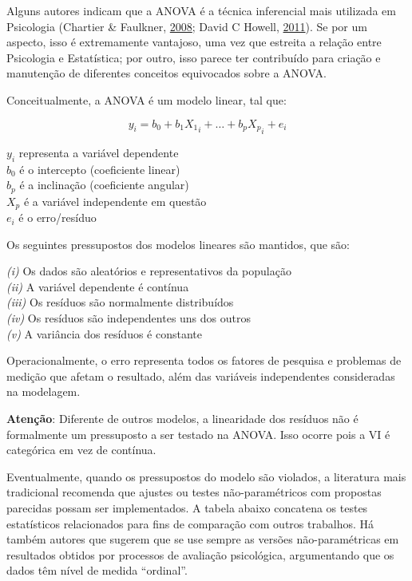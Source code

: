 \documentclass[
]{book}
\begin{document}
Alguns autores indicam que a ANOVA é a técnica inferencial mais
utilizada em Psicologia (Chartier \& Faulkner,
\protect\hyperlink{ref-Chartier2008}{2008}; David C Howell,
\protect\hyperlink{ref-Howell2011}{2011}). Se por um aspecto, isso é
extremamente vantajoso, uma vez que estreita a relação entre Psicologia
e Estatística; por outro, isso parece ter contribuído para criação e
manutenção de diferentes conceitos equivocados sobre a ANOVA.

Conceitualmente, a ANOVA é um modelo linear, tal que:

\[y_i = b_0 + b_1X{_1}_i + \dots + b_pX{_p}_i + e_i\]

\(y_i\) representa a variável dependente\\
\(b_0\) é o intercepto (coeficiente linear)\\
\(b_p\) é a inclinação (coeficiente angular)\\
\(X_p\) é a variável independente em questão\\
\(e_i\) é o erro/resíduo

Os seguintes pressupostos dos modelos lineares são mantidos, que são:

\emph{(i)} Os dados são aleatórios e representativos da população\\
\emph{(ii)} A variável dependente é contínua\\
\emph{(iii)} Os resíduos são normalmente distribuídos\\
\emph{(iv)} Os resíduos são independentes uns dos outros\\
\emph{(v)} A variância dos resíduos é constante

Operacionalmente, o erro representa todos os fatores de pesquisa e
problemas de medição que afetam o resultado, além das variáveis
independentes consideradas na modelagem.

\begin{warning}

\textbf{Atenção}: Diferente de outros modelos, a linearidade dos
resíduos não é formalmente um pressuposto a ser testado na ANOVA. Isso
ocorre pois a VI é categórica em vez de contínua.

\end{warning}

Eventualmente, quando os pressupostos do modelo são violados, a
literatura mais tradicional recomenda que ajustes ou testes
não-paramétricos com propostas parecidas possam ser implementados. A
tabela abaixo concatena os testes estatísticos relacionados para fins de
comparação com outros trabalhos. Há também autores que sugerem que se
use sempre as versões não-paramétricas em resultados obtidos por
processos de avaliação psicológica, argumentando que os dados têm nível
de medida ``ordinal''.
\end{document}
